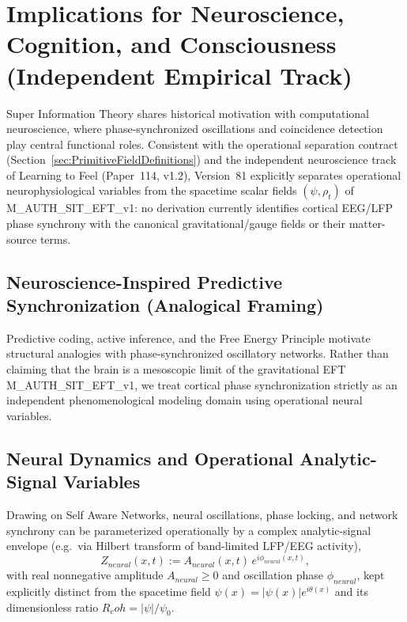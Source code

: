 \documentclass[american,11pt,letterpaper]{article}
\newcommand{\Rcoh}{R_{\mathrm{coh}}}
\def\mathbf#1{#1}%
\def\mathrm#1{#1}%
\def\texttt#1{#1}%
\def\emph#1{#1}%
\def\Rcoh{R_coh}%
\begin{document}
\section{Implications for Neuroscience, Cognition, and Consciousness (Independent Empirical Track)}
\label{sec:neuroscience-implications}
\label{sec:neuroscience-cognition-implications}

Super Information Theory shares historical motivation with computational neuroscience, where phase-synchronized oscillations and coincidence detection play central functional roles. Consistent with the operational separation contract (Section~\ref{sec:PrimitiveFieldDefinitions}) and the independent neuroscience track of \emph{Learning to Feel} (Paper~114, v1.2), Version~81 explicitly separates operational neurophysiological variables from the spacetime scalar fields $(\psi, \rho_t)$ of \texttt{M\_AUTH\_SIT\_EFT\_v1}: no derivation currently identifies cortical EEG/LFP phase synchrony with the canonical gravitational/gauge fields or their matter-source terms.

\subsection{Neuroscience-Inspired Predictive Synchronization (Analogical Framing)}

Predictive coding, active inference, and the Free Energy Principle motivate structural analogies with phase-synchronized oscillatory networks. Rather than claiming that the brain is a mesoscopic limit of the gravitational EFT \texttt{M\_AUTH\_SIT\_EFT\_v1}, we treat cortical phase synchronization strictly as an independent phenomenological modeling domain using operational neural variables.

\subsection{Neural Dynamics and Operational Analytic-Signal Variables}

Drawing on Self Aware Networks, neural oscillations, phase locking, and network synchrony can be parameterized operationally by a complex analytic-signal envelope (e.g.\ via Hilbert transform of band-limited LFP/EEG activity),
\begin{equation}
Z_{\mathrm{neural}}(\mathbf{x}, t) := A_{\mathrm{neural}}(\mathbf{x}, t)\,e^{i\phi_{\mathrm{neural}}(\mathbf{x}, t)},
\label{eq:neural_analytic_signal}
\end{equation}
with real nonnegative amplitude $A_{\mathrm{neural}} \ge 0$ and oscillation phase $\phi_{\mathrm{neural}}$, kept explicitly distinct from the spacetime field $\psi(x) = |\psi(x)|e^{i\theta(x)}$ and its dimensionless ratio $\Rcoh = |\psi|/\psi_0$.
\end{document}

